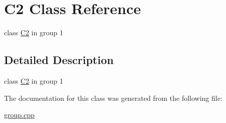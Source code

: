 \hypertarget{classC2}{\section{C2 Class Reference}
\label{classC2}
}


class \hyperlink{classC2}{C2} in group 1  




\subsection{Detailed Description}
class \hyperlink{classC2}{C2} in group 1 

The documentation for this class was generated from the following file\-:\begin{DoxyCompactItemize}
\item 
\hyperlink{group_8cpp}{group.\-cpp}\end{DoxyCompactItemize}
